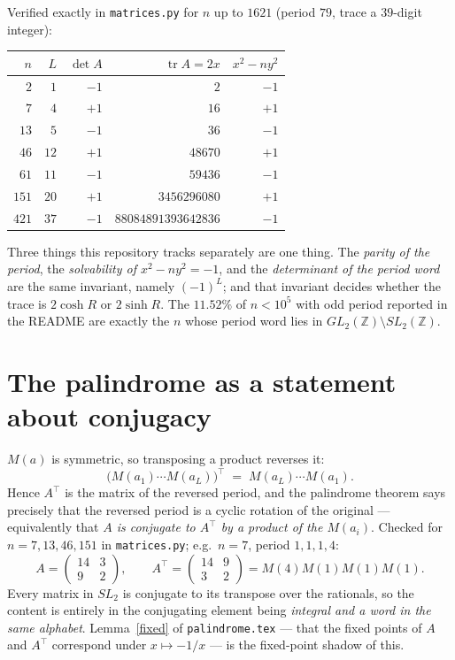 \documentclass[12pt,a4paper]{article}
\theoremstyle{plain}
\theoremstyle{definition}
\newcommand{\tr}{\operatorname{tr}}
\newcommand{\Mat}[4]{\begin{pmatrix} #1 & #2 \\ #3 & #4\end{pmatrix}}
\begin{document}
Verified exactly in \texttt{matrices.py} for $n$ up to $1621$ (period $79$, trace a $39$-digit integer):

\begin{center}
\begin{tabular}{rrrrr}
\toprule
$n$ & $L$ & $\det A$ & $\tr A = 2x$ & $x^2-ny^2$ \\
\midrule
$2$   & $1$  & $-1$ & $2$                   & $-1$ \\
$7$   & $4$  & $+1$ & $16$                  & $+1$ \\
$13$  & $5$  & $-1$ & $36$                  & $-1$ \\
$46$  & $12$ & $+1$ & $48670$               & $+1$ \\
$61$  & $11$ & $-1$ & $59436$               & $-1$ \\
$151$ & $20$ & $+1$ & $3456296080$          & $+1$ \\
$421$ & $37$ & $-1$ & $88084891393642836$   & $-1$ \\
\bottomrule
\end{tabular}
\end{center}

\begin{tcolorbox}[colback=blue!6, colframe=blue!45!black, arc=2mm]
Three things this repository tracks separately are one thing. The \emph{parity of the period}, the \emph{solvability of $x^2-ny^2=-1$}, and the \emph{determinant of the period word} are the same invariant, namely $(-1)^L$; and that invariant decides whether the trace is $2\cosh R$ or $2\sinh R$. The $11.52\%$ of $n<10^5$ with odd period reported in the README are exactly the $n$ whose period word lies in $GL_2(\mathbb{Z}) \setminus SL_2(\mathbb{Z})$.
\end{tcolorbox}

\section{The palindrome as a statement about conjugacy}

$M(a)$ is symmetric, so transposing a product reverses it:
\[
  \bigl(M(a_1)\cdots M(a_L)\bigr)^{\!\top} \;=\; M(a_L)\cdots M(a_1).
\]
Hence $A^\top$ is the matrix of the reversed period, and the palindrome theorem says precisely that the reversed period is a cyclic rotation of the original --- equivalently that \emph{$A$ is conjugate to $A^\top$ by a product of the $M(a_i)$}. Checked for $n=7,13,46,151$ in \texttt{matrices.py}; e.g.\ $n=7$, period $1,1,1,4$:
\[
  A = \Mat{14}{3}{9}{2}, \qquad A^\top = \Mat{14}{9}{3}{2} = M(4)M(1)M(1)M(1).
\]
Every matrix in $SL_2$ is conjugate to its transpose over the rationals, so the content is entirely in the conjugating element being \emph{integral and a word in the same alphabet}. Lemma~\ref{fixed} of \texttt{palindrome.tex} --- that the fixed points of $A$ and $A^\top$ correspond under $x\mapsto -1/x$ --- is the fixed-point shadow of this.
\end{document}
